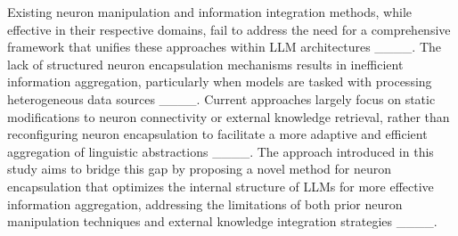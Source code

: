Existing neuron manipulation and information integration methods, while effective in their respective domains, fail to address the need for a comprehensive framework that unifies these approaches within LLM architectures ____. The lack of structured neuron encapsulation mechanisms results in inefficient information aggregation, particularly when models are tasked with processing heterogeneous data sources ____. Current approaches largely focus on static modifications to neuron connectivity or external knowledge retrieval, rather than reconfiguring neuron encapsulation to facilitate a more adaptive and efficient aggregation of linguistic abstractions ____. The approach introduced in this study aims to bridge this gap by proposing a novel method for neuron encapsulation that optimizes the internal structure of LLMs for more effective information aggregation, addressing the limitations of both prior neuron manipulation techniques and external knowledge integration strategies ____.